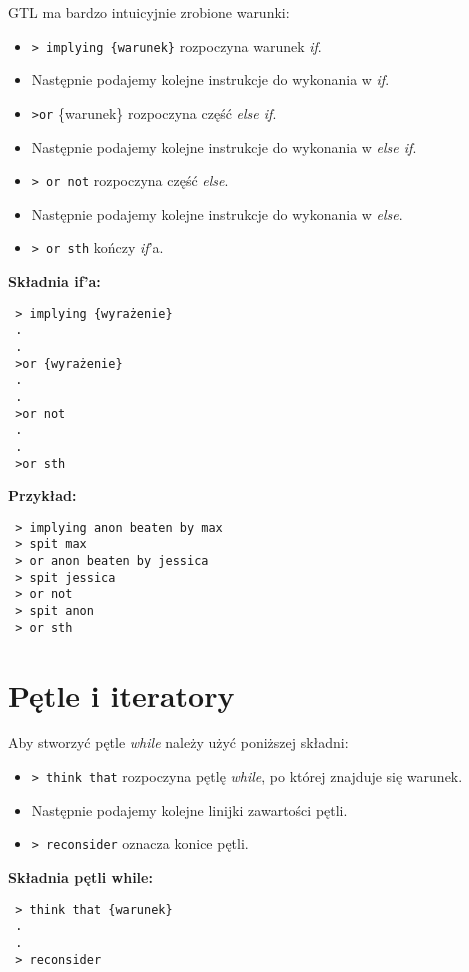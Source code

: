 \documentclass{article}
\begin{document}
GTL ma bardzo intuicyjnie zrobione warunki:

\begin{itemize}
    \item \texttt{> implying \{warunek\}} rozpoczyna warunek \textit{if}.
    \item Następnie podajemy kolejne instrukcje do wykonania w \textit{if}.
    \item \texttt{>or} \{warunek\} rozpoczyna część \textit{else if}.
    \item Następnie podajemy kolejne instrukcje do wykonania w \textit{else if}.
    \item \texttt{> or not} rozpoczyna część \textit{else}.
    \item Następnie podajemy kolejne instrukcje do wykonania w \textit{else}.
    \item \texttt{> or sth} kończy \textit{if}'a.

\end{itemize}
\textbf{Składnia if'a:}
{ \color{green}
\begin{verbatim}
 > implying {wyrażenie}
 .
 .
 >or {wyrażenie}
 .
 .
 >or not
 .
 .
 >or sth
\end{verbatim}
}
\textbf{Przykład:}
{ \color{green}
\begin{verbatim}
 > implying anon beaten by max
 > spit max
 > or anon beaten by jessica
 > spit jessica
 > or not
 > spit anon
 > or sth
\end{verbatim}
}

\section{Pętle i iteratory}

Aby stworzyć pętle \textit{while} należy użyć poniższej składni:

\begin{itemize}
    \item \texttt{> think that} rozpoczyna pętlę \textit{while}, po której znajduje się warunek.
    \item Następnie podajemy kolejne linijki zawartości pętli.
    \item \texttt{> reconsider} oznacza konice pętli.
\end{itemize}

\textbf{Składnia pętli while:}
{ \color{green}
\begin{verbatim}
 > think that {warunek}
 .
 .
 > reconsider
\end{verbatim}
}
\end{document}
